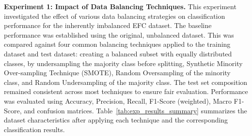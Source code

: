 \documentclass[12pt]{article}
\begin{document}
\textbf{Experiment 1: Impact of Data Balancing Techniques.} This experiment investigated the effect of various data
balancing strategies on classification performance for the inherently imbalanced EFC dataset. The baseline performance
was established using the original, unbalanced dataset. This was compared against four common balancing techniques applied
to the training dataset and test dataset: creating a balanced subset with equally distributed classes, by undersampling the majority
class before splitting, Synthetic Minority Over-sampling Technique (SMOTE), Random Oversampling of the minority class, and
Random Undersampling of the majority class. The test set composition remained consistent across most techniques to
ensure fair evaluation. Performance was evaluated using Accuracy, Precision, Recall, F1-Score (weighted), Macro F1-Score,
and confusion matrices. Table~\ref{tab:exp_results_summary} summarizes the dataset characteristics after applying each
technique and the corresponding classification results.
\end{document}
